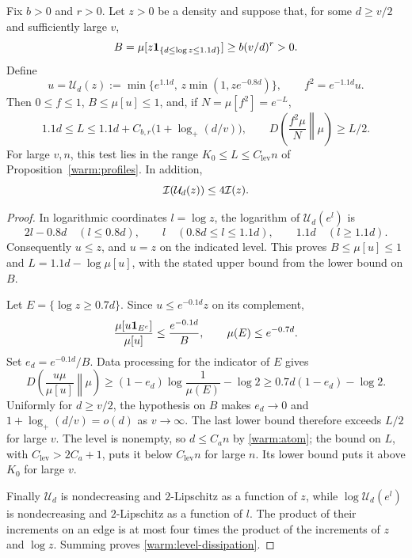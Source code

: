 \begin{lemma}\label{warm:log-layer}
Fix \(b>0\) and \(r>0\).  Let \(z>0\) be a density and suppose that,
for some \(d\ge v/2\) and sufficiently large \(v\),
\[
 B=\mu[z\mathbf 1_{\{d\le\log z\le1.1d\}}]
       \ge b(v/d)^r>0 .
\]
Define
\begin{equation}
 u=\mathcal U_d(z)
   :=\min\{e^{1.1d},\,z\min(1,ze^{-0.8d})\},
 \qquad f^2=e^{-1.1d}u .                                 \label{warm:level-transform}
\end{equation}
Then \(0\le f\le1\), \(B\le\mu[u]\le1\), and, if
\(N=\mu[f^2]=e^{-L}\),
\[
 1.1d\le L\le1.1d+C_{b,r}\bigl(1+\log_+(d/v)\bigr),
 \qquad
 D\!\left(\frac{f^2\mu}{N}\middle\Vert\mu\right)\ge L/2 .
\]
For large \(v,n\), this test lies in the range
\(K_0\le L\le C_{\mathrm{lev}}n\) of Proposition~\ref{warm:profiles}.  In addition,
\begin{equation}
 \mathcal I(\mathcal U_d(z))\le4\mathcal I(z).                          \label{warm:level-dissipation}
\end{equation}
\end{lemma}

\begin{proof}
In logarithmic coordinates \(l=\log z\), the logarithm of
\(\mathcal U_d(e^l)\) is
\[
 2l-0.8d\quad(l\le0.8d),\qquad
 l\quad(0.8d\le l\le1.1d),\qquad
 1.1d\quad(l\ge1.1d).
\]
Consequently \(u\le z\), and \(u=z\) on the indicated level.
This proves \(B\le\mu[u]\le1\) and
\(L=1.1d-\log\mu[u]\), with the stated upper bound from the lower
bound on \(B\).

Let \(E=\{\log z\ge0.7d\}\).  Since \(u\le e^{-0.1d}z\) on its
complement,
\[
 \frac{\mu[u\mathbf 1_{E^c}]}{\mu[u]}\le\frac{e^{-0.1d}}B,
 \qquad \mu(E)\le e^{-0.7d}.
\]
Set \(e_d=e^{-0.1d}/B\).  Data processing for the indicator of
\(E\) gives
\[
 D\!\left(\frac{u\mu}{\mu[u]}\middle\Vert\mu\right)
 \ge (1-e_d)\log\frac1{\mu(E)}-\log2
 \ge0.7d(1-e_d)-\log2 .
\]
Uniformly for \(d\ge v/2\), the hypothesis on \(B\) makes
\(e_d\to0\) and \(1+\log_+(d/v)=o(d)\) as \(v\to\infty\).
The last lower bound therefore exceeds \(L/2\) for large \(v\).
The level is nonempty, so \(d\le C_an\) by \eqref{warm:atom};
the bound on \(L\), with \(C_{\mathrm{lev}}>2C_a+1\), puts it below \(C_{\mathrm{lev}}n\)
for large \(n\).  Its lower bound puts it above \(K_0\) for large
\(v\).

Finally \(\mathcal U_d\) is nondecreasing and \(2\)-Lipschitz as a
function of \(z\), while \(\log\mathcal U_d(e^l)\) is nondecreasing
and \(2\)-Lipschitz as a function of \(l\).  The product of their
increments on an edge is at most four times the product of the
increments of \(z\) and \(\log z\).  Summing proves
\eqref{warm:level-dissipation}.
\end{proof}

